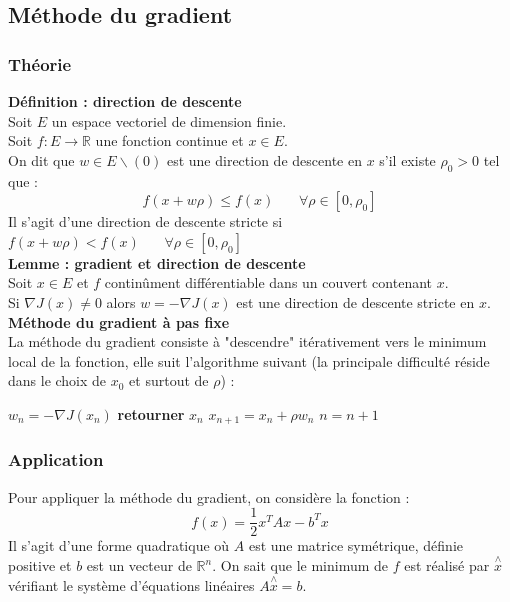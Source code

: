 \documentclass[a4paper,10pt]{report}
\begin{document}
\subsection{Méthode du gradient}
\subsubsection{Théorie}
\textbf{Définition : direction de descente}\\
Soit $E$ un espace vectoriel de dimension finie.\\
Soit $f:E \longrightarrow \mathbb{R}$ une fonction continue et $x \in E$.\\
On dit que $w \in E\backslash (0)$ est une direction de descente en $x$ s'il existe $\rho_0>0$ tel que :\\
\abovedisplayskip=0mm
\begin{displaymath}
f(x+w\rho)\leq f(x) \ \ \ \ \ \ \ \ \forall \rho \in [0,\rho_0]
\end{displaymath}
Il s'agit d'une direction de descente stricte si $f(x+w\rho)< f(x) \ \ \ \ \ \ \ \ \forall \rho \in [0,\rho_0]$ \\

\textbf{Lemme : gradient et direction de descente}\\
Soit $x \in E$ et $f$ continûment différentiable dans un couvert contenant $x$.\\
Si $\nabla J(x) \neq 0$ alors $w = - \nabla J(x)$ est une direction de descente stricte en $x$.\\

\textbf{Méthode du gradient à pas fixe}\\
La méthode du gradient consiste à "descendre" itérativement vers le minimum local de la fonction, elle suit l'algorithme suivant (la principale difficulté réside dans le choix de $x_0$ et surtout de $\rho$) :\\
\begin{algorithm}
\begin{algorithmic}
\REPEAT
\STATE $w_n= - \nabla J(x_n)$
\STATE \textbf{retourner } $x_n$
\ELSE
\STATE $x_{n+1}=x_n+\rho w_n$
\ENDIF
\STATE $n=n+1$
\end{algorithmic}
\end{algorithm}

\subsubsection{Application}
Pour appliquer la méthode du gradient, on considère la fonction :\\
\abovedisplayskip=0mm
\begin{displaymath}
f(x) = \frac{1}{2}x^TAx - b^Tx
\end{displaymath}
Il s'agit d'une forme quadratique où $A$ est une matrice symétrique, définie positive et $b$ est un vecteur de $\mathbb{R}^n$. On sait que le minimum de $f$ est réalisé par $\overset{\wedge}{x}$ vérifiant le système d'équations linéaires $A\overset{\wedge}{x}=b$. \\
\end{document}
